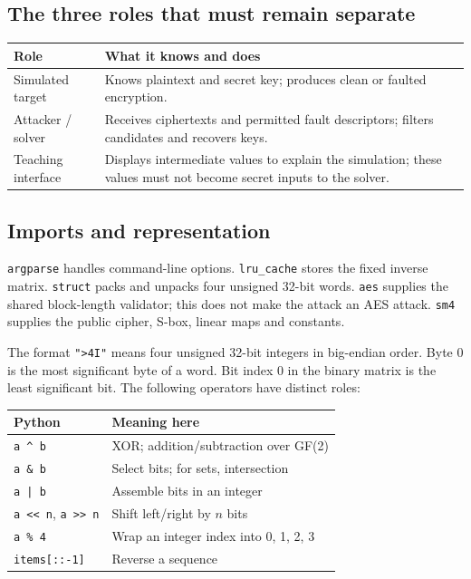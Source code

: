 \documentclass[11pt,a4paper]{article}
\newcommand{\hx}[1]{\texttt{#1}}
\begin{document}
\subsection{The three roles that must remain separate}
\begin{center}\begin{tabular}{p{.22\linewidth}p{.68\linewidth}}\toprule
Role & What it knows and does\\\midrule
Simulated target & Knows plaintext and secret key; produces clean or faulted encryption.\\
Attacker / solver & Receives ciphertexts and permitted fault descriptors; filters candidates and recovers keys.\\
Teaching interface & Displays intermediate values to explain the simulation; these values must not become secret inputs to the solver.\\\bottomrule
\end{tabular}\end{center}

\subsection{Imports and representation}
\hx{argparse} handles command-line options. \hx{lru\_cache} stores the fixed inverse
matrix. \hx{struct} packs and unpacks four unsigned 32-bit words.
\hx{aes} supplies the shared block-length validator; this does not make the attack
an AES attack. \hx{sm4} supplies the public cipher, S-box, linear maps and constants.

The format \hx{">4I"} means four unsigned 32-bit integers in big-endian order.
Byte 0 is the most significant byte of a word. Bit index 0 in the binary matrix
is the least significant bit. The following operators have distinct roles:
\begin{center}\begin{tabular}{ll}\toprule
Python & Meaning here\\\midrule
\hx{a \^{} b} & XOR; addition/subtraction over GF(2)\\
\hx{a \& b} & Select bits; for sets, intersection\\
\hx{a | b} & Assemble bits in an integer\\
\hx{a << n}, \hx{a >> n} & Shift left/right by $n$ bits\\
\hx{a \% 4} & Wrap an integer index into 0, 1, 2, 3\\
\hx{items[::-1]} & Reverse a sequence\\\bottomrule
\end{tabular}\end{center}
\end{document}
